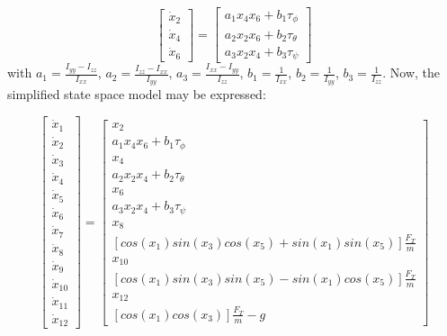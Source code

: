 \begin{equation}
\begin{bmatrix}
\dot{x}_{2}\\
\dot{x}_{4}\\
\dot{x}_{6}
\end{bmatrix}
=
\begin{bmatrix}
a_{1}x_{4}x_{6}+b_{1}\tau_{\phi}\\
a_{2}x_{2}x_{6}+b_{2}\tau_{\theta}\\
a_{3}x_{2}x_{4}+b_{3}\tau_{\psi}
\end{bmatrix}
\end{equation}
with $a_{1}=\frac{I_{yy}-I_{zz}}{I_{xx}}$, $a_{2}=\frac{I_{zz}-I_{xx}}{I_{yy}}$, $a_{3}=\frac{I_{xx}-I_{yy}}{I_{zz}}$, $b_{1}=\frac{1}{I_{xx}}$, $b_{2}=\frac{1}{I_{yy}}$, $b_{3}=\frac{1}{I_{zz}}$. Now, the simplified state space model may be expressed:

\begin{equation}\label{eqn:simpleStateModel}
\begin{bmatrix}
\dot{x}_{1}\\
\dot{x}_{2}\\
\dot{x}_{3}\\
\dot{x}_{4}\\
\dot{x}_{5}\\
\dot{x}_{6}\\
\dot{x}_{7}\\
\dot{x}_{8}\\
\dot{x}_{9}\\
\dot{x}_{10}\\
\dot{x}_{11}\\
\dot{x}_{12}
\end{bmatrix}
=
\begin{bmatrix}
x_{2}\\
a_{1}x_{4}x_{6}+b_{1}\tau_{\phi}\\
x_{4}\\
a_{2}x_{2}x_{4}+b_{2}\tau_{\theta}\\
x_{6}\\
a_{3}x_{2}x_{4}+b_{3}\tau_{\psi}\\
x_{8}\\
[cos(x_{1})sin(x_{3})cos(x_{5})+sin(x_{1})sin(x_{5})]\frac{F_{T}}{m}\\
x_{10}\\
[cos(x_{1})sin(x_{3})sin(x_{5})-sin(x_{1})cos(x_{5})]\frac{F_{T}}{m}\\
x_{12}\\
[cos(x_{1})cos(x_{3})]\frac{F_{T}}{m}-g
\end{bmatrix}
\end{equation}

